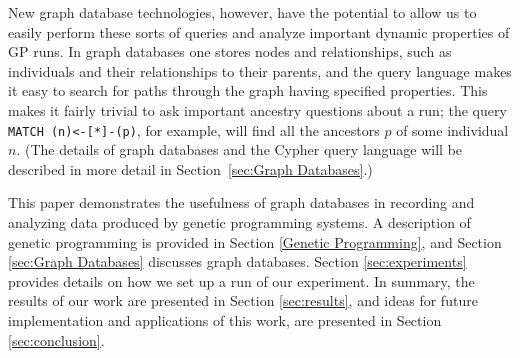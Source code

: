 \documentclass[12pt]{article}
\begin{document}
New graph database technologies, however, have the potential to allow us to easily perform these sorts of queries and analyze important dynamic properties of GP runs. In graph databases one stores nodes and relationships, such as individuals and their relationships to their parents, and the query language makes it easy to search for paths through the graph having specified properties. This makes it fairly trivial to ask important ancestry questions about a run; the query \texttt{MATCH (n)<-[*]-(p)}, for example, will find all the ancestors $p$ of some individual $n$. (The details of graph databases and the Cypher query language will be described in more detail in Section~\ref{sec:Graph Databases}.)

This paper demonstrates the usefulness of graph databases in recording and analyzing data produced by genetic programming systems. A description of genetic programming is provided in Section \ref{Genetic Programming}, and Section \ref{sec:Graph Databases} discusses graph databases. Section \ref{sec:experiments} provides details on how we set up a run of our experiment. In summary, the results of our work are presented in Section \ref{sec:results}, and ideas for future implementation and applications of this work, are presented in Section \ref{sec:conclusion}.



\end{document}
